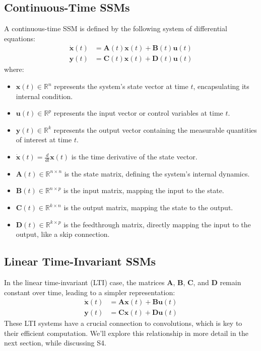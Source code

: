 \documentclass[12pt,a4paper]{report}
\begin{document}
\subsection{Continuous-Time SSMs}
A continuous-time SSM is defined by the following system of differential equations:
\[
\begin{aligned}
\dot{\mathbf{x}}(t) &= \mathbf{A}(t)\mathbf{x}(t) + \mathbf{B}(t)\mathbf{u}(t) \\
\mathbf{y}(t) &= \mathbf{C}(t)\mathbf{x}(t) + \mathbf{D}(t)\mathbf{u}(t)
\end{aligned}
\]
where:
\begin{itemize}
    \item $\mathbf{x}(t) \in \mathbb{R}^n$ represents the system's state vector at time $t$, encapsulating its internal condition.
    \item $\mathbf{u}(t) \in \mathbb{R}^p$ represents the input vector or control variables at time $t$.
    \item $\mathbf{y}(t) \in \mathbb{R}^k$ represents the output vector containing the measurable quantities of interest at time $t$.
    \item $\dot{\mathbf{x}}(t) = \frac{d}{dt}\mathbf{x}(t)$ is the time derivative of the state vector.
    \item $\mathbf{A}(t) \in \mathbb{R}^{n \times n}$ is the state matrix, defining the system's internal dynamics.
    \item $\mathbf{B}(t) \in \mathbb{R}^{n \times p}$ is the input matrix, mapping the input to the state.
    \item $\mathbf{C}(t) \in \mathbb{R}^{k \times n}$ is the output matrix, mapping the state to the output.
    \item $\mathbf{D}(t) \in \mathbb{R}^{k \times p}$ is the feedthrough matrix, directly mapping the input to the output, like a skip connection.
\end{itemize}

\subsection{Linear Time-Invariant SSMs}
In the linear time-invariant (LTI) case, the matrices $\mathbf{A}$, $\mathbf{B}$, $\mathbf{C}$, and $\mathbf{D}$ remain constant over time, leading to a simpler representation:
\[
\begin{aligned}
\dot{\mathbf{x}}(t) &= \mathbf{A}\mathbf{x}(t) + \mathbf{B}\mathbf{u}(t) \\
\mathbf{y}(t) &= \mathbf{C}\mathbf{x}(t) + \mathbf{D}\mathbf{u}(t)
\end{aligned}
\]
These LTI systems have a crucial connection to convolutions, which is key to their efficient computation. We'll explore this relationship in more detail in the next section, while discussing S4.
\end{document}
